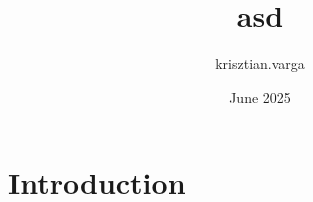 \documentclass{article}
\title{asd}
\author{krisztian.varga }
\date{June 2025}
\begin{document}
\maketitle

\section{Introduction}
\end{document}
